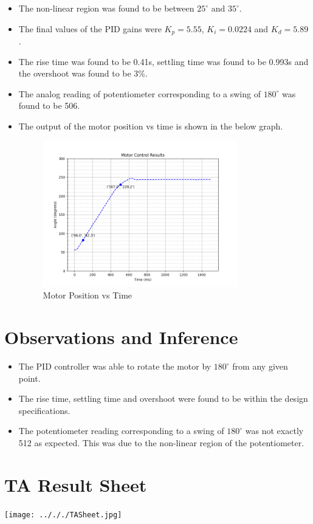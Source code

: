 \documentclass{article}
\begin{document}
\begin{itemize}[nolistsep]
    \item The non-linear region was found to be between $25^{\circ}$ and $35^{\circ}$.
    \item The final values of the PID gains were $K_p = 5.55$, $K_i = 0.0224$ and $K_d = 5.89$.
    \item The rise time was found to be 0.41s, settling time was found to be 0.993s and the overshoot was found to be 3\%.
    \item The analog reading of potentiometer corresponding to a swing of $180^{\circ}$ was found to be 506.
    \item The output of the motor position vs time is shown in the below graph.
    \begin{figure}[!htb]
        \centering
        \includegraphics[width=0.8\textwidth]{../././motor_control.png}
        \caption{Motor Position vs Time}
        \label{fig:plot}
    \end{figure}
\end{itemize}

\section{Observations and Inference}
\begin{itemize}[nolistsep]
    \item The PID controller was able to rotate the motor by $180^{\circ}$ from any given point.
    \item The rise time, settling time and overshoot were found to be within the design specifications.
    \item The potentiometer reading corresponding to a swing of $180^{\circ}$ was not exactly 512 as expected. This was due to the non-linear region of the potentiometer.
\end{itemize}

\section{TA Result Sheet}

\begin{center}
    \texttt{[image: ../././TASheet.jpg]}
\end{center}
\end{document}
